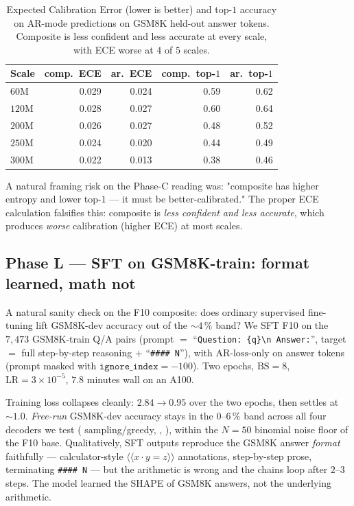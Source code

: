 \begin{table}[h]
\centering
\begin{tabular}{lrrrr}
\toprule
Scale & comp.\ ECE & ar.\ ECE & comp.\ top-$1$ & ar.\ top-$1$ \\
\midrule
$60$M & 0.029 & 0.024 & 0.59 & 0.62 \\
$120$M & 0.028 & 0.027 & 0.60 & 0.64 \\
$200$M & 0.026 & 0.027 & 0.48 & 0.52 \\
$250$M & 0.024 & 0.020 & 0.44 & 0.49 \\
$300$M & 0.022 & 0.013 & 0.38 & 0.46 \\
\bottomrule
\end{tabular}
\caption{Expected Calibration Error (lower is better) and top-$1$
accuracy on AR-mode predictions on GSM8K held-out answer tokens.
Composite is less confident and less accurate at every scale, with
ECE worse at $4$ of $5$ scales.}
\label{tab:ece}
\end{table}

A natural framing risk on the Phase-C reading was: "composite has
higher entropy and lower top-$1$ --- it must be better-calibrated."
The proper ECE calculation falsifies this: composite is \emph{less
confident and less accurate}, which produces \emph{worse} calibration
(higher ECE) at most scales.

\subsection{Phase L — SFT on GSM8K-train: format learned, math not}
\label{sec:phase-l}

A natural sanity check on the F10 composite: does ordinary supervised
fine-tuning lift GSM8K-dev accuracy out of the $\sim 4\,\%$ band? We
SFT F10 on the $7{,}473$ GSM8K-train Q/A pairs (prompt $=$
``\texttt{Question: \{q\}{\textbackslash}n\,Answer:}'', target
$=$ full step-by-step reasoning $+$ ``\texttt{\#\#\#\# N}''), with
$\text{AR-loss-only}$ on answer tokens (prompt masked with
$\texttt{ignore\_index}{=}{-}100$). Two epochs, $\text{BS}{=}8$,
$\text{LR}{=}3\!\times\!10^{-5}$, $7.8$ minutes wall on an A100.

Training loss collapses cleanly: $2.84 \to 0.95$ over the two
epochs, then settles at $\sim 1.0$. \emph{Free-run} GSM8K-dev
accuracy stays in the $0$--$6\,\%$ band across all four decoders we
test ( sampling/greedy, ,
), within the $N=50$ binomial noise floor
of the F10 base. Qualitatively, SFT outputs reproduce the GSM8K answer
\emph{format} faithfully — calculator-style $\langle\langle x\!\cdot\!
y\!=\!z \rangle\rangle$ annotations, step-by-step prose, terminating
\texttt{\#\#\#\# N} — but the arithmetic is wrong and the chains
loop after $2$--$3$ steps. The model learned the SHAPE of GSM8K
answers, not the underlying arithmetic.

